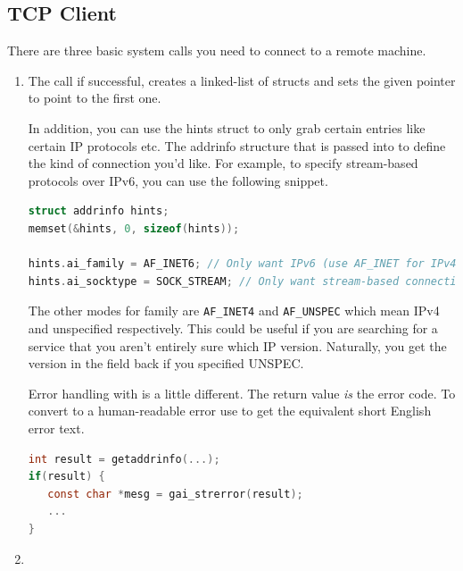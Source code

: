 \subsection{TCP Client}

There are three basic system calls you need to connect to a remote machine.

\begin{enumerate}

\item {}

The  call if successful, creates a linked-list of  structs and sets the given pointer to point to the first one.

In addition, you can use the hints struct to only grab certain entries like certain IP protocols etc.
The addrinfo structure that is passed into  to define the kind of connection you'd like.
For example, to specify stream-based protocols over IPv6, you can use the following snippet.

\begin{lstlisting}[language=C]
struct addrinfo hints;
memset(&hints, 0, sizeof(hints));

hints.ai_family = AF_INET6; // Only want IPv6 (use AF_INET for IPv4)
hints.ai_socktype = SOCK_STREAM; // Only want stream-based connection
\end{lstlisting}

The other modes for family are \texttt{AF\_INET4} and \texttt{AF\_UNSPEC} which mean IPv4 and unspecified respectively.
This could be useful if you are searching for a service that you aren't entirely sure which IP version.
Naturally, you get the version in the field back if you specified UNSPEC.

Error handling with  is a little different.
The return value \emph{is} the error code.
To convert to a human-readable error use  to get the equivalent short English error text.

\begin{lstlisting}[language=C]
int result = getaddrinfo(...);
if(result) {
   const char *mesg = gai_strerror(result);
   ...
}
\end{lstlisting}


\item {}


\end{enumerate}
